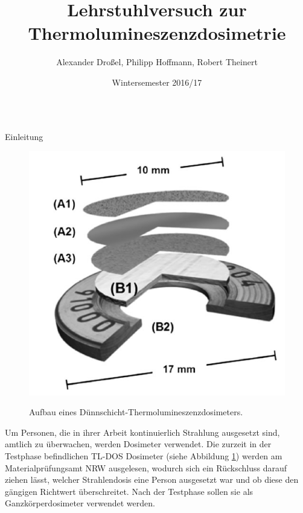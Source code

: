 \documentclass[20pt]{beamer}
\title{Lehrstuhlversuch zur Thermolumineszenzdosimetrie}
\author{Alexander Droßel, Philipp Hoffmann, Robert Theinert}
\date{Wintersemester 2016/17}
\institute{%
  \texttt{[image: tudo.pdf]}%
}
\begin{document}
  \begin{columns}[onlytextwidth]%

    \begin{column}{0.5\textwidth}%
      \begin{block}[equal height group=A]{Einleitung}%
              \begin{multicols}{2}
				\begin{figure}
            		\includegraphics[width=0.8\linewidth]{bilder/dosi}\\
                    \caption{Aufbau eines Dünnschicht-Thermolumineszenzdosimeters.\cite{TL-DOS} }
            		\label{TL-DOS}
          		\end{figure}
                  \begin{large}
          Um Personen, die in ihrer Arbeit kontinuierlich Strahlung ausgesetzt sind, amtlich zu überwachen, werden Dosimeter verwendet.
          Die zurzeit in der Testphase befindlichen TL-DOS Dosimeter (siehe Abbildung \ref{TL-DOS}) werden am Materialprüfungsamt NRW ausgelesen, wodurch sich ein Rückschluss darauf ziehen lässt, welcher Strahlendosis eine Person ausgesetzt war und ob diese den gängigen Richtwert überschreitet. Nach der Testphase sollen sie als Ganzkörperdosimeter verwendet werden.
                  \end{large}


\end{multicols}
\end{block}
\end{column}
\end{columns}
\end{document}
